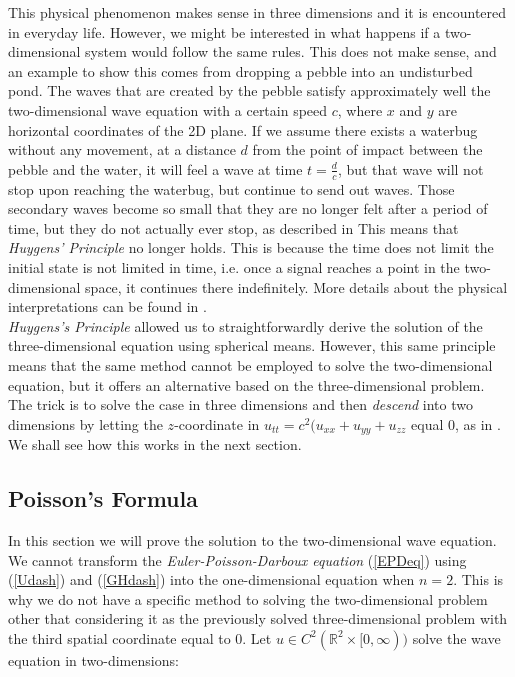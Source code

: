 \documentclass[a4paper, 12pt]{article}
\numberwithin{equation}{section}
\begin{document}
This physical phenomenon makes sense in three dimensions and it is encountered in everyday life. However, we might be interested in what happens if a two-dimensional system would follow
the same rules. This does not make sense, and an example to show this comes from dropping a pebble into an undisturbed pond. The waves that are created by the pebble satisfy 
approximately well the two-dimensional wave equation with a certain speed $c$, where $x$ and $y$ are horizontal coordinates of the 2D plane. If we assume there exists
a waterbug without any movement, at a distance $d$ from the point of impact between the pebble and the water, it will feel a wave at time $t=\frac{d}{c}$, but that wave will
not stop upon reaching the waterbug, but continue to send out waves. Those secondary waves become so small that they are no longer felt after a period of time, but they 
do not actually ever stop, as described in \cite{Str} This means that \emph{Huygens' Principle} no longer holds. This is because the time does not limit the initial state is not limited 
in time, i.e. once a signal reaches a point in the two-dimensional space, it continues there indefinitely. More details about the physical interpretations can be found in \cite{Hil}.
\\

\emph{Huygens's Principle} allowed us to straightforwardly derive the solution of the three-dimensional equation using spherical means. However, this same principle
means that the same method cannot be employed to solve the two-dimensional equation, but it offers an alternative based on the three-dimensional problem. The trick is
to solve the case in three dimensions and then \emph{descend} into two dimensions by letting the $z$-coordinate in $u_{tt}=c^2(u_{xx}+u_{yy}+u_{zz}$ equal $0$, as in \cite{Ev}. We shall see how this works in the 
next section. 

\subsection{Poisson's Formula}

In this section we will prove the solution to the two-dimensional wave equation. We cannot transform the \emph{Euler-Poisson-Darboux equation} (\ref{EPDeq}) using (\ref{Udash}) and (\ref{GHdash}) 
into the one-dimensional equation when $n=2$. This is why we do not have a specific method to solving the two-dimensional problem other that considering it as the previously solved three-dimensional problem
with the third spatial coordinate equal to $0$. Let $u \in C^2(\mathbb{R}^2 \times [0, \infty))$ solve the wave equation in two-dimensions:
\end{document}
